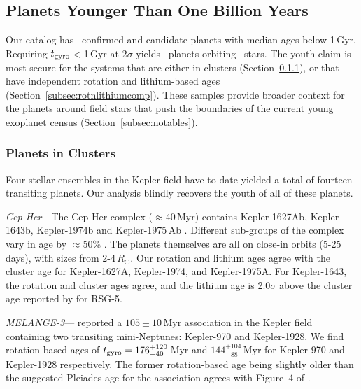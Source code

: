 \documentclass[11pt,twocolumn,tighten]{aastex63}
\begin{document}
\subsection{Planets Younger Than One Billion Years}

Our catalog has \nplyounggyro\ confirmed
and candidate planets with median ages below 1\,Gyr.  Requiring
$t_{\rm gyro}$$<$1\,Gyr at 2$\sigma$ yields \nplyounggyrotwosigma\
planets orbiting \nplhostsyounggyrotwosigma\ stars.  The youth claim
is most secure for the systems that are either in clusters
(Section~\ref{subsec:clusterplanets}), or that have independent
rotation and lithium-based ages
(Section~\ref{subsec:rotnlithiumcomp}).  These samples provide broader
context for the planets around field stars that push the boundaries of
the current young exoplanet census (Section~\ref{subsec:notables}).

\subsubsection{Planets in Clusters}
\label{subsec:clusterplanets}

Four stellar ensembles in the Kepler field have to date yielded a
total of fourteen transiting planets.  Our analysis blindly recovers
the youth of all of these planets.

{\it Cep-Her}---The Cep-Her complex ($\approx$40\,Myr) contains
Kepler-1627Ab, Kepler-1643b, Kepler-1974b and Kepler-1975\,Ab
\citep{Bouma_2022a,Bouma_2022b}.  Different sub-groups of the complex
vary in age by $\approx$50\% \citep{Kerr2024}.  The planets
themselves are all on close-in orbits (5-25\,days), with sizes from
2-4\,$R_\oplus$.  Our rotation and lithium ages agree with the cluster
age for Kepler-1627A, Kepler-1974, and Kepler-1975A.  For Kepler-1643,
the rotation and cluster ages agree, and the lithium age is
2.0$\sigma$ above the cluster age reported by \citet{Bouma_2022b} for
RSG-5.

{\it MELANGE-3}---\citet{Barber_2022} reported a $105\pm10$\,Myr
association in the Kepler field containing two transiting
mini-Neptunes: Kepler-970 and Kepler-1928.  We find rotation-based
ages of $t_{\rm gyro}=176_{-40}^{+120}$\,Myr and
$144_{-88}^{+104}$\,Myr for Kepler-970 and Kepler-1928 respectively.
The former rotation-based age being slightly older than the suggested
Pleiades age for the association agrees with Figure~4 of
\citet{Barber_2022}.
\end{document}
